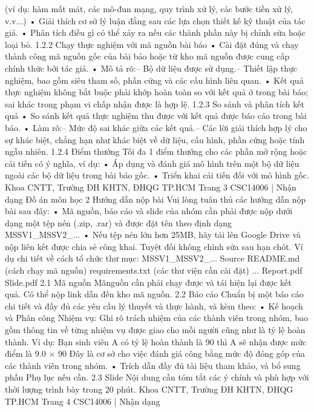 (ví dụ: hàm mất mát, các mô-đun mạng, quy trình xử lý, các bước tiền xử lý, v.v...)
• Giải thích cơ sở lý luận đằng sau các lựa chọn thiết kế kỹ thuật của tác giả.
• Phân tích điều gì có thể xảy ra nếu các thành phần này bị chỉnh sửa hoặc loại bỏ.
1.2.2 Chạy thực nghiệm với mã nguồn bài báo
• Cài đặt đúng và chạy thành công mã nguồn gốc của bài báo hoặc từ kho mã nguồn được
cung cấp chính thức bởi tác giả.
• Mô tả rõ:– Bộ dữ liệu được sử dụng.– Thiết lập thực nghiệm, bao gồm siêu tham số, phần cứng và các cấu hình liên quan.
• Kết quả thực nghiệm không bắt buộc phải khớp hoàn toàn so với kết quả ở trong bài báo;
sai khác trong phạm vi chấp nhận được là hợp lệ.
1.2.3 So sánh và phân tích kết quả
• So sánh kết quả thực nghiệm thu được với kết quả được báo cáo trong bài báo.
• Làm rõ:– Mức độ sai khác giữa các kết quả.– Các lời giải thích hợp lý cho sự khác biệt, chẳng hạn như khác biệt về dữ liệu, cấu hình,
phần cứng hoặc tính ngẫu nhiên.
1.2.4 Điểm thưởng
Tối đa 1 điểm thưởng cho các phần mở rộng hoặc cải tiến có ý nghĩa, ví dụ:
• Áp dụng và đánh giá mô hình trên một bộ dữ liệu ngoài các bộ dữ liệu trong bài báo gốc.
• Triển khai cải tiến đối với mô hình gốc.
Khoa CNTT, Trường ĐH KHTN, ĐHQG TP.HCM
Trang 3
CSC14006 | Nhận dạng
Đồ án môn học
2 Hướng dẫn nộp bài
Vui lòng tuân thủ các hướng dẫn nộp bài sau đây:
• Mã nguồn, báo cáo và slide của nhóm cần phải được nộp dưới dạng một tệp nén (.zip, .rar)
và được đặt tên theo định dạng MSSV1_MSSV2_...
• Nếu tệp nén lớn hơn 25MB, hãy tải lên Google Drive và nộp liên kết được chia sẻ công khai.
Tuyệt đối không chỉnh sửa sau hạn chót.
Ví dụ chi tiết về cách tổ chức thư mục:
MSSV1_MSSV2_...
Source
README.md (cách chạy mã nguồn)
requirements.txt (các thư viện cần cài đặt)
...
Report.pdf
Slide.pdf
2.1 Mã nguồn
Mãnguồn cần phải chạy được và tái hiện lại được kết quả. Có thể nộp link dẫn đến kho mã nguồn.
2.2 Báo cáo
Chuẩn bị một báo cáo chi tiết và đầy đủ các yêu cầu lý thuyết và thực hành, và kèm theo:
• Kế hoạch và Phân công Nhiệm vụ: Ghi rõ trách nhiệm của các thành viên trong nhóm,
bao gồm thông tin về từng nhiệm vụ được giao cho mỗi người cũng như là tỷ lệ hoàn thành.
Ví dụ: Bạn sinh viên A có tỷ lệ hoàn thành là 90%
thì A sẽ nhận được mức điểm là 9.0 × 90%
Đây là cơ sở cho việc đánh giá công bằng mức độ đóng góp của các thành viên trong nhóm.
• Trích dẫn đầy đủ tài liệu tham khảo, và bổ sung phần Phụ lục nếu cần.
2.3 Slide
Nội dung cần tóm tắt các ý chính và phù hợp với thời lượng trình bày trong 20 phút.
Khoa CNTT, Trường ĐH KHTN, ĐHQG TP.HCM
Trang 4
CSC14006 | Nhận dạng
